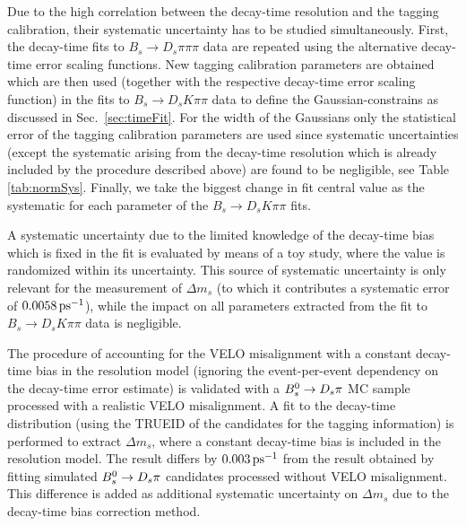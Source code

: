 Due to the high correlation between the decay-time resolution and the tagging calibration, their systematic uncertainty has to be studied simultaneously.
First, the decay-time fits to $B_s \to D_s \pi\pi\pi$ data are repeated using the alternative decay-time error scaling functions.
New tagging calibration parameters are obtained which are then used (together with the respective decay-time error scaling function) in the fits to $B_s \to D_s K\pi\pi$ data
to define the Gaussian-constrains as discussed in Sec.~\ref{sec:timeFit}.
For the width of the Gaussians only the statistical error of the tagging calibration parameters are used since systematic uncertainties (except the systematic arising from the decay-time resolution which is already included by the procedure described above) are found to be negligible, see Table \ref{tab:normSys}.
Finally, we take the biggest change in fit central value as the systematic for each parameter of the $B_s \to D_s K\pi\pi$ fits.

A systematic uncertainty due to the limited knowledge of the decay-time bias which is fixed in the fit
is evaluated by means of a toy study, where the value is randomized within its uncertainty.
This source of systematic uncertainty is only relevant for the measurement of $\Delta m_s$ (to which it contributes a systematic error of $0.0058 {\mathrm{ \,ps}}^{-1}$), 
while the impact on all parameters extracted from the fit to  $B_s \to D_s K\pi\pi$ data is negligible.

The procedure of accounting for the VELO misalignment with a constant decay-time bias in the resolution model 
(\ie ignoring the event-per-event dependency on the decay-time error estimate) is validated with a ${{B}^0_{s}}\rightarrow{\ensuremath{{D}_{s}}}{\ensuremath{\pi}}$ MC sample processed with a realistic VELO misalignment.
A fit to the decay-time distribution (using the \textsf{TRUEID} of the candidates for the tagging information) is performed to extract $\Delta m_s$, 
where a constant decay-time bias is included in the resolution model.
The result differs by $0.003{\mathrm{ \,ps^{-1}}}$ from the result obtained by fitting simulated ${{B}^0_{s}}\rightarrow{\ensuremath{{D}_{s}}}{\ensuremath{\pi}}$ candidates processed without VELO misalignment. 
This difference is added as additional systematic uncertainty on $\Delta m_s$ due to the decay-time bias correction method.

